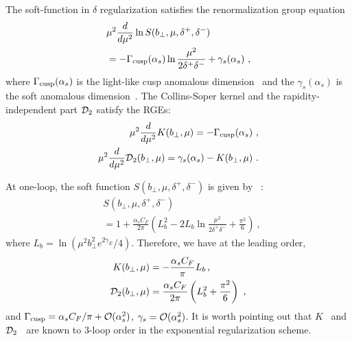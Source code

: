 \documentclass[aps,rmp,reprint,amsmath,amssymb,graphicx,longbibliography]{revtex4-1} %
\begin{document}
The soft-function in $\delta$ regularization satisfies the renormalization group equation
\begin{align}
	&\mu^2\frac{d}{d\mu^2}\ln S(b_\perp,\mu,\delta^+,\delta^-)\nonumber \\
	&=-\Gamma_{\rm cusp}(\alpha_s)\ln \frac{\mu^2}{2\delta^+\delta^-} + \gamma_s(\alpha_s)\ ,
\end{align}
where $\Gamma_{\rm cusp}(\alpha_s) $ is the light-like cusp anomalous dimension~\cite{Polyakov:1980ca,Korchemsky:1987wg} and the $\gamma_s(\alpha_s)$ is the soft anomalous dimension~\cite{Korchemskaya:1992je}. The Collins-Soper kernel and the rapidity-independent part ${\cal D}_2$ satisfy the RGEs:
\begin{align}
	\mu^2\frac{d}{d\mu^2} K(b_\perp,\mu)=-\Gamma_{\rm cusp}(\alpha_s) \label{eq:cusp}\ ,\\
	\mu^2\frac{d}{d\mu^2} {\cal D}_2(b_\perp,\mu)=\gamma_s(\alpha_s)-K(b_\perp,\mu) \label{eq:ad_d2}\ .
\end{align}

At one-loop, the soft function $S(b_\perp,\mu,\delta^+,\delta^-)$ is given by~\cite{Echevarria:2012js} :
\begin{align}
	&S(b_\perp,\mu,\delta^+,\delta^-)\nonumber \\ &=1+\frac{\alpha_s C_F}{2\pi}\left(L_b^2-2L_b \ln \frac{\mu^2}{2\delta^+\delta^-}+\frac{\pi^2}{6}\right) \ ,
\end{align}
where $L_b=\ln\left(\mu^2 b_\perp^2e^{2\gamma_E}/4\right)$.
Therefore, we have at the leading order,
\begin{align}
	K(b_\perp,\mu)&=-\frac{\alpha_sC_F}{\pi} L_b  \,,\\
	{\cal D}_2(b_\perp,\mu)&=\frac{\alpha_s C_F}{2\pi}\left(L_b^2+\frac{\pi^2}{6}\right) \ ,
\end{align}
and $\Gamma_{\rm cusp}=\alpha_s C_F/\pi +{\cal O}(\alpha_s^2)$, $\gamma_s={\cal O}(\alpha_s^2)$. It is worth pointing out that $K$~\cite{Li:2016ctv,Vladimirov:2016dll} and ${\cal D}_2$~\cite{Li:2016ctv} are known to 3-loop order in the exponential regularization scheme.
\end{document}
